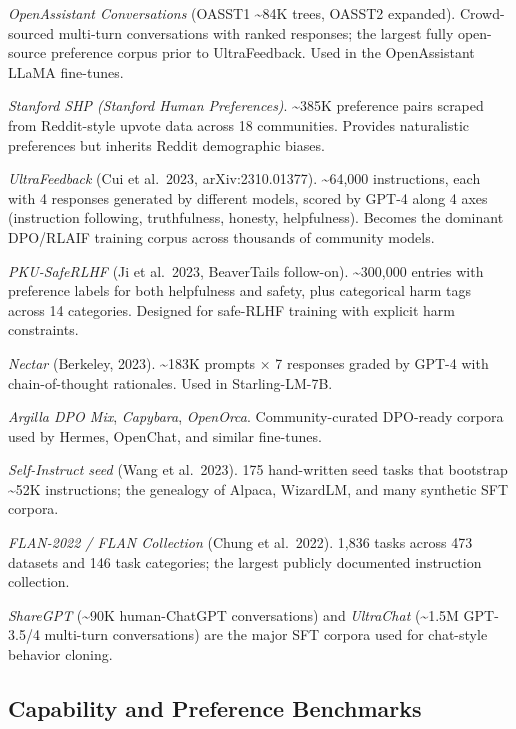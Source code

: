 \documentclass{article}
\begin{document}
\emph{OpenAssistant Conversations} (OASST1 \textasciitilde84K trees, OASST2 expanded). Crowd-sourced multi-turn conversations with ranked responses; the largest fully open-source preference corpus prior to UltraFeedback. Used in the OpenAssistant LLaMA fine-tunes.

\emph{Stanford SHP (Stanford Human Preferences)}. \textasciitilde385K preference pairs scraped from Reddit-style upvote data across 18 communities. Provides naturalistic preferences but inherits Reddit demographic biases.

\emph{UltraFeedback} (Cui et al.~2023, arXiv:2310.01377). \textasciitilde64,000 instructions, each with 4 responses generated by different models, scored by GPT-4 along 4 axes (instruction following, truthfulness, honesty, helpfulness). Becomes the dominant DPO/RLAIF training corpus across thousands of community models.

\emph{PKU-SafeRLHF} (Ji et al.~2023, BeaverTails follow-on). \textasciitilde300,000 entries with preference labels for both helpfulness and safety, plus categorical harm tags across 14 categories. Designed for safe-RLHF training with explicit harm constraints.

\emph{Nectar} (Berkeley, 2023). \textasciitilde183K prompts × 7 responses graded by GPT-4 with chain-of-thought rationales. Used in Starling-LM-7B.

\emph{Argilla DPO Mix}, \emph{Capybara}, \emph{OpenOrca}. Community-curated DPO-ready corpora used by Hermes, OpenChat, and similar fine-tunes.

\emph{Self-Instruct seed} (Wang et al.~2023). 175 hand-written seed tasks that bootstrap \textasciitilde52K instructions; the genealogy of Alpaca, WizardLM, and many synthetic SFT corpora.

\emph{FLAN-2022 / FLAN Collection} (Chung et al.~2022). 1,836 tasks across 473 datasets and 146 task categories; the largest publicly documented instruction collection.

\emph{ShareGPT} (\textasciitilde90K human-ChatGPT conversations) and \emph{UltraChat} (\textasciitilde1.5M GPT-3.5/4 multi-turn conversations) are the major SFT corpora used for chat-style behavior cloning.

\subsection{Capability and Preference Benchmarks}\label{capability-and-preference-benchmarks}
\end{document}
